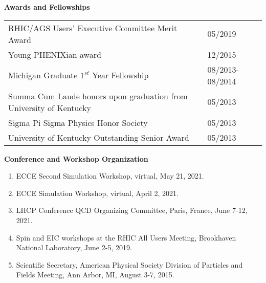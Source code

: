\documentclass[11pt]{article}
\begin{document}
\newpage

\vspace{7pt}
\begin{flushleft}
	\LARGE\textbf{Awards and Fellowships} \\
	\normalsize
	
	\begin{tabular}{ll}
		
		RHIC/AGS Users' Executive Committee Merit Award & 05/2019\\
		Young PHENIXian award & 12/2015\\
		Michigan Graduate $1^{st}$ Year Fellowship & 08/2013-08/2014 \\
		Summa Cum Laude honors upon graduation from University of Kentucky & 05/2013 \\
		Sigma Pi Sigma Physics Honor Society & 05/2013 \\
		University of Kentucky Outstanding Senior Award & 05/2013\\
	\end{tabular}
\end{flushleft}












\vspace{7pt}
\begin{flushleft}
	\LARGE\textbf{Conference and Workshop Organization} \\
	\normalsize 
	\begin{enumerate}
		\item ECCE Second Simulation Workshop, virtual, May 21, 2021.
		\item ECCE Simulation Workshop, virtual, April 2, 2021.
		\item LHCP Conference QCD Organizing Committee, Paris, France, June 7-12, 2021.
		\item Spin and EIC workshops at the RHIC All Users Meeting, Brookhaven National Laboratory, June 2-5, 2019.
		\item Scientific Secretary, American Physical Society Division of Particles and Fields Meeting, Ann Arbor, MI, August 3-7, 2015.
	\end{enumerate}
\end{flushleft}
\end{document}

